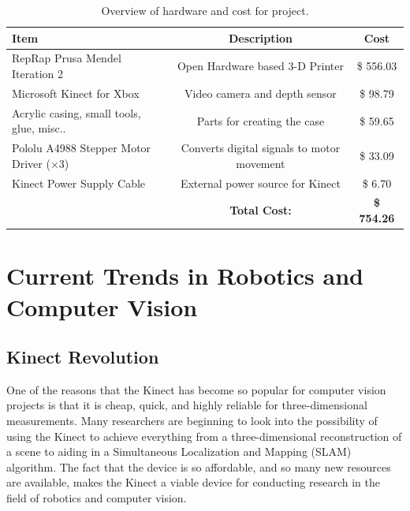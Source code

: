 \documentclass[pdftex,10.5pt]{report}
\begin{document}
\begin{table}[h]
	\centering
 	\begin{tabular}{|l|c|c|}
		\hline
		\textbf{Item} & \textbf{Description} & \textbf{Cost} \\
		\hline
 		RepRap Prusa Mendel Iteration 2 & Open Hardware based 3-D Printer& \$ 556.03\\
		Microsoft Kinect for Xbox & Video camera and depth sensor & \$ 98.79 \\
		Acrylic casing, small tools, glue, misc.. & Parts for creating the case & \$ 59.65 \\
		Pololu A4988 Stepper Motor Driver ($\times 3$)   & Converts digital signals to motor movement & \$ 33.09 \\
		Kinect Power Supply Cable & External power source for Kinect & \$ 6.70 \\
		\hline
		& \textbf{Total Cost:} & \textbf{\$  754.26} \\
		\hline
	\end{tabular}
	\caption{
	Overview of hardware and cost for project.
	}	
\label{tab:costs}
\end{table}

\section{Current Trends in Robotics and Computer Vision}

\subsection{Kinect Revolution}
One of the reasons that the Kinect has become so popular for computer vision projects is that it is cheap, quick, and highly reliable for three-dimensional measurements. Many researchers are beginning to look into the possibility of using the Kinect to achieve everything from a three-dimensional reconstruction of a scene to aiding in a Simultaneous Localization and Mapping (SLAM) algorithm. The fact that the device is so affordable, and so many new resources are available, makes the Kinect a viable device for conducting research in the field of robotics and computer vision.
\end{document}
